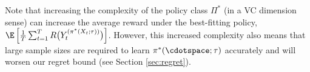 Note that increasing the complexity of the policy class $\Pi^*$ (in a VC dimension sense) can increase the average reward under the best-fitting policy, $\E \left[ \frac{1}{T} \sum_{t=1}^T R \big(Y_{t}^{(\pi^*(X_t; \tau))} \big)\right]$. However, this increased complexity also means that large sample sizes are required to learn $\pi^*(\cdotspace; \tau)$ accurately and will worsen our regret bound (see Section \ref{sec:regret}).

